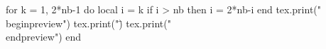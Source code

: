\documentclass[border=2 mm]{article}
\begin{document}
\begin{luacode*}
for k = 1, 2*nb-1 do
    local i = k
    if i > nb then i = 2*nb-i end
    tex.print("\\begin{preview}")
    tex.print("\")
    tex.print("\\end{preview}")
end
\end{luacode*}
\end{document}
